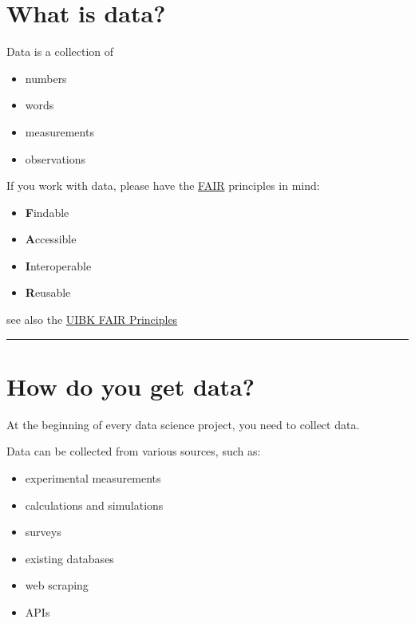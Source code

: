 \documentclass[
  letterpaper,
  DIV=11,
  numbers=noendperiod]{scrreprt}
\providecommand{\tightlist}{%
  \setlength{\itemsep}{0pt}\setlength{\parskip}{0pt}}\usepackage{longtable,booktabs,array}
\begin{document}

\section*{What is data?}\label{what-is-data}


Data is a collection of

\begin{itemize}
\tightlist
\item
  numbers
\item
  words
\item
  measurements
\item
  observations
\end{itemize}

If you work with data, please have the
\href{https://www.go-fair.org/fair-principles/}{FAIR} principles in
mind:

\begin{itemize}
\tightlist
\item
  \textbf{F}indable
\item
  \textbf{A}ccessible
\item
  \textbf{I}nteroperable
\item
  \textbf{R}eusable
\end{itemize}

see also the
\href{https://www.uibk.ac.at/zid/forschungsdaten/forschungsdatenmanagement/fair.html}{UIBK
FAIR Principles}

\begin{center}\rule{0.5\linewidth}{0.5pt}\end{center}

\section*{How do you get data?}\label{how-do-you-get-data}


At the beginning of every data science project, you need to collect
data.

Data can be collected from various sources, such as:

\begin{itemize}
\tightlist
\item
  experimental measurements
\item
  calculations and simulations
\item
  surveys
\item
  existing databases
\item
  web scraping
\item
  APIs
\end{itemize}
\end{document}
